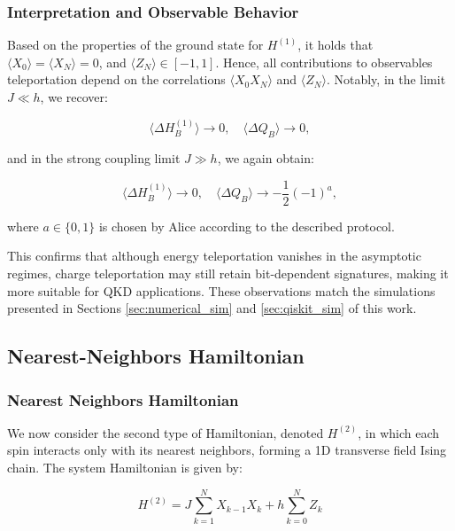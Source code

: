 \subsubsection{Interpretation and Observable Behavior}

Based on the properties of the ground state for \( H^{(1)} \), it holds that \( \langle X_0 \rangle = \langle X_N \rangle = 0 \), and \( \langle Z_N \rangle \in [-1, 1] \). Hence, all contributions to observables teleportation depend on the correlations \( \langle X_0 X_N \rangle \) and \( \langle Z_N \rangle \). Notably, in the limit \( J \ll h \), we recover:

\begin{equation*}
\langle \Delta H_B^{(1)} \rangle \to 0, \quad \langle \Delta Q_B \rangle \to 0,
\end{equation*}

and in the strong coupling limit \( J \gg h \), we again obtain:

\begin{equation*}
\langle \Delta H_B^{(1)} \rangle \to 0, \quad \langle \Delta Q_B \rangle \to -\frac{1}{2} (-1)^a,
\end{equation*}

where \( a \in \{0,1\} \) is chosen by Alice according to the described protocol.

This confirms that although energy teleportation vanishes in the asymptotic regimes, charge teleportation may still retain bit-dependent signatures, making it more suitable for QKD applications. These observations match the simulations presented in Sections \ref{sec:numerical_sim} and \ref{sec:qiskit_sim} of this work.

\subsection{Nearest-Neighbors Hamiltonian}
\label{sec:nn_hamiltonian}

\subsubsection{Nearest Neighbors Hamiltonian}

We now consider the second type of Hamiltonian, denoted \( H^{(2)} \), in which each spin interacts only with its nearest neighbors, forming a 1D transverse field Ising chain. The system Hamiltonian is given by:

\begin{equation}
H^{(2)} = J \sum_{k=1}^{N} X_{k-1} X_k + h \sum_{k=0}^{N} Z_k
\label{eq:H2}
\end{equation}

